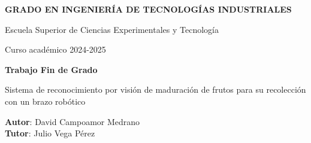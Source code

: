 \thispagestyle{empty}
\vspace{2cm}

\begin{figure}[htb]
  \centerline{}
\end{figure}

\begin{center}
  {\Large {\bf GRADO EN INGENIERÍA DE TECNOLOGÍAS INDUSTRIALES}}
  \vspace{5mm}
 
  {\large {Escuela Superior de Ciencias Experimentales y Tecnología}}
  \vspace{5mm}

  {\large {Curso académico 2024-2025}}

  \vspace{1cm}

  {\large {\bf Trabajo Fin de Grado}}

  \vspace{2cm}

  {\Large {Sistema de reconocimiento por visión de maduración de frutos para su recolección con un brazo robótico\\ [1cm] }}

  \vspace{5cm}
  {\bf Autor}: David Campoamor Medrano \\
  {\bf Tutor}: Julio Vega Pérez 
\end{center}

\clearpage
\thispagestyle{empty}
